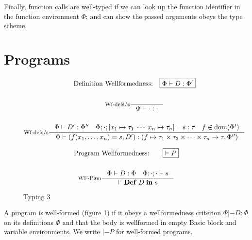\documentclass[a4paper, oneside, 10pt, draft]{memoir}
\begin{document}
Finally, function calls are well-typed if we can look up the function
identifier in the function environment $\Phi$; and can show the
passed arguments obeys the type scheme.

\section{Programs}
\newcommand{\dom}[1]{\mathrm{dom}(#1)}
\begin{figure}
  \begin{gather*}
    \text{Definition Wellformedness:} \quad \boxed{\Phi |- D : \Phi'}\\\\
    \inference[Wf-defs/z]{}{\Phi |- \cdot : \cdot}\\\\
    \inference[Wf-defs/s]{\Phi |- D' : \Phi'' \quad \Phi;\cdot;[x_1 \mapsto
      \tau_1 \; \dotsb \; x_n \mapsto \tau_n] |- s :
      \tau \quad f \not \in \dom{\Phi'}}{\Phi |- (f(x_1, \dotsc, x_n) = s, D') : (f \mapsto \ntypes -> \tau, \Phi'')}
  \end{gather*}

  \begin{gather*}
    \text{Program Wellformedness:} \quad \quad \boxed{|- P}\\\\
    \inference[WF-Pgm]{\Phi |- D : \Phi \quad \Phi;\cdot;\cdot |- s}{|- \ipgm{D}{s}}
  \end{gather*}
  \caption{Typing 3}
  \label{fig:type-judgement-3}
\end{figure}

A program is well-formed (figure \ref{fig:type-judgement-3}) if it
obeys a wellformedness criterion $\boxed{\Phi |- D : \Phi}$ on its
definitions $\Phi$ and that the body is wellformed in empty Basic
block and variable environments. We write $\boxed{|- P}$ for
well-formed programs.
\end{document}
